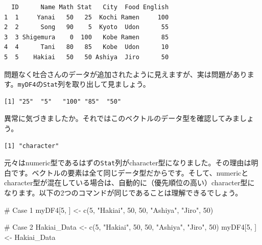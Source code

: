 \documentclass[
  a4paper,
  pandoc,
  ja=standard,
  jafont=haranoaji]{bxjsbook}
\newenvironment{Shaded}{\begin{snugshade}}{\end{snugshade}}
\newcommand{\CommentTok}[1]{\textcolor[rgb]{0.37,0.37,0.37}{#1}}
\newcommand{\DecValTok}[1]{\textcolor[rgb]{0.68,0.00,0.00}{#1}}
\newcommand{\FunctionTok}[1]{\textcolor[rgb]{0.28,0.35,0.67}{#1}}
\newcommand{\NormalTok}[1]{\textcolor[rgb]{0.00,0.48,0.65}{#1}}
\newcommand{\OtherTok}[1]{\textcolor[rgb]{0.00,0.48,0.65}{#1}}
\newcommand{\SpecialCharTok}[1]{\textcolor[rgb]{0.37,0.37,0.37}{#1}}
\newcommand{\StringTok}[1]{\textcolor[rgb]{0.13,0.47,0.30}{#1}}
\begin{document}
\begin{verbatim}
  ID      Name Math Stat   City  Food English
1  1     Yanai   50   25  Kochi Ramen     100
2  2      Song   90    5  Kyoto  Udon      55
3  3 Shigemura    0  100   Kobe Ramen      85
4  4      Tani   80   85   Kobe  Udon      10
5  5    Hakiai   50   50 Ashiya  Jiro      50
\end{verbatim}

問題なく吐合さんのデータが追加されたように見えますが、実は問題があります。\texttt{myDF4}の\texttt{Stat}列を取り出して見ましょう。

\begin{Shaded}
\end{Shaded}

\begin{verbatim}
[1] "25"  "5"   "100" "85"  "50" 
\end{verbatim}

異常に気づきましたか。それではこのベクトルのデータ型を確認してみましょう。

\begin{Shaded}
\end{Shaded}

\begin{verbatim}
[1] "character"
\end{verbatim}

元々はnumeric型であるはずの\texttt{Stat}列がcharacter型になりました。その理由は明白です。ベクトルの要素は全て同じデータ型だからです。そして、numericとcharacter型が混在している場合は、自動的に（優先順位の高い）character型になります。以下の2つのコマンドが同じであることは理解できるでしょう。

\begin{Shaded}
\begin{Highlighting}[]
\CommentTok{\# Case 1}
\NormalTok{myDF4[}\DecValTok{5}\NormalTok{, ] }\OtherTok{\textless{}{-}} \FunctionTok{c}\NormalTok{(}\DecValTok{5}\NormalTok{, }\StringTok{"Hakiai"}\NormalTok{, }\DecValTok{50}\NormalTok{, }\DecValTok{50}\NormalTok{, }\StringTok{"Ashiya"}\NormalTok{, }\StringTok{"Jiro"}\NormalTok{, }\DecValTok{50}\NormalTok{)}

\CommentTok{\# Case 2}
\NormalTok{Hakiai\_Data }\OtherTok{\textless{}{-}} \FunctionTok{c}\NormalTok{(}\DecValTok{5}\NormalTok{, }\StringTok{"Hakiai"}\NormalTok{, }\DecValTok{50}\NormalTok{, }\DecValTok{50}\NormalTok{, }\StringTok{"Ashiya"}\NormalTok{, }\StringTok{"Jiro"}\NormalTok{, }\DecValTok{50}\NormalTok{)}
\NormalTok{myDF4[}\DecValTok{5}\NormalTok{, ]  }\OtherTok{\textless{}{-}}\NormalTok{ Hakiai\_Data}
\end{Highlighting}
\end{Shaded}
\end{document}
